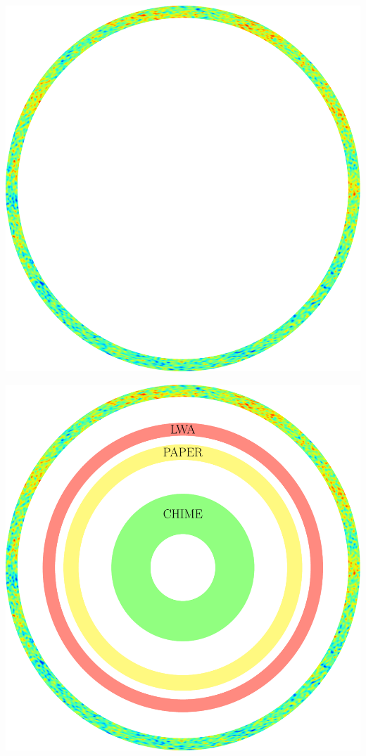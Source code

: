 \documentclass{beamer}
\begin{document}
\begin{frame}
\begin{overprint}
\begin{center}
        \end{center}
        \begin{center}
            \includegraphics[height=\textheight]{figures/scalemap2} %
        \end{center}
        \begin{center}
            \includegraphics[height=\textheight]{figures/scalemap4}
        \end{center}
    \end{overprint}
\end{frame}
\end{document}
